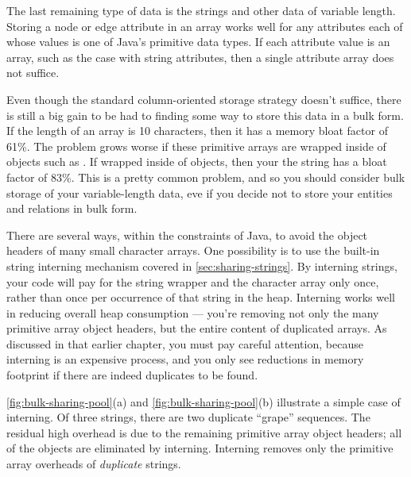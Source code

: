 The last remaining type of data is the strings and other data of variable
length. Storing a node or edge attribute in an array works well for any
attributes each of whose values is one of Java's primitive data types. If each
attribute value is an array, such as the case with string attributes, then a
single attribute array does not suffice. 

Even though the standard column-oriented storage strategy doesn't suffice, there
is still a big gain to be had to finding some way to store this data in a bulk
form.
If the length of an array is 10 characters, then it has a memory bloat factor of
61\%.
The problem grows worse if these primitive arrays are wrapped inside of objects
such as . If wrapped inside of  objects, then your
the string has a bloat factor of 83\%.
This is a pretty common problem, and so you should consider bulk storage of your
variable-length data, eve if you decide not to store your entities and relations
in bulk form.

There are several ways, within the constraints of Java, to avoid the object
headers of many small character arrays. One possibility is to use the built-in
string interning mechanism covered in
\autoref{sec:sharing-strings}. By interning strings, your code
will pay for the string wrapper and the character array only once, rather than
once per occurrence of that string in the heap. Interning works well in reducing
overall heap consumption --- you're removing not only the many primitive array
object headers, but the entire content of duplicated arrays. As discussed in
that earlier chapter, you must pay careful attention, because interning is an
expensive process, and you only see reductions in memory footprint if there are
indeed duplicates to be found. 

\autoref{fig:bulk-sharing-pool}(a) and \autoref{fig:bulk-sharing-pool}(b)
illustrate a simple case of interning. Of three strings, there are two duplicate
``grape'' sequences. The residual high overhead is due to the remaining
primitive array object headers; all of the  objects are eliminated
by interning. Interning removes only the primitive array overheads of
\emph{duplicate} strings.

